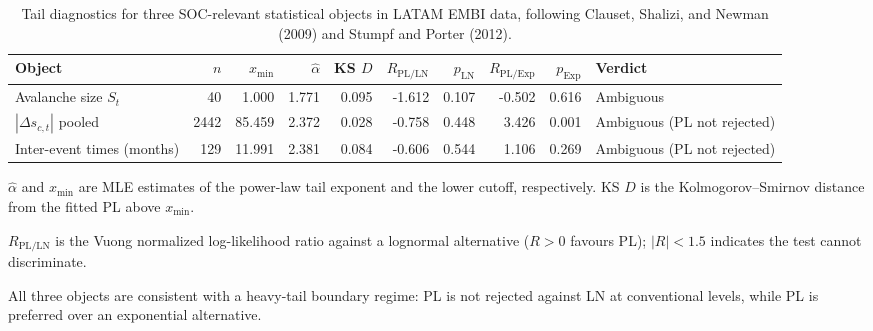 \begin{table}[!htbp]
\centering
\footnotesize
\begin{threeparttable}
\caption{Tail diagnostics for three SOC-relevant statistical objects in LATAM EMBI data, following Clauset, Shalizi, and Newman (2009) and Stumpf and Porter (2012).}
\label{tab:tail_diagnostics}
\begin{tabular}{lrrrrrrrrl}
\toprule
Object & $n$ & $x_{\min}$ & $\hat{\alpha}$ & KS $D$ & $R_{\mathrm{PL/LN}}$ & $p_{\mathrm{LN}}$ & $R_{\mathrm{PL/Exp}}$ & $p_{\mathrm{Exp}}$ & Verdict \\
\midrule
Avalanche size $S_t$ & 40 & 1.000 & 1.771 & 0.095 & -1.612 & 0.107 & -0.502 & 0.616 & Ambiguous \\
$|\Delta s_{c,t}|$ pooled & 2442 & 85.459 & 2.372 & 0.028 & -0.758 & 0.448 & 3.426 & 0.001 & Ambiguous (PL not rejected) \\
Inter-event times (months) & 129 & 11.991 & 2.381 & 0.084 & -0.606 & 0.544 & 1.106 & 0.269 & Ambiguous (PL not rejected) \\
\bottomrule
\end{tabular}
\begin{tablenotes}\footnotesize
\item $\hat{\alpha}$ and $x_{\min}$ are MLE estimates of the power-law tail exponent and the lower cutoff, respectively. KS $D$ is the Kolmogorov--Smirnov distance from the fitted PL above $x_{\min}$.
\item $R_{\mathrm{PL/LN}}$ is the Vuong normalized log-likelihood ratio against a lognormal alternative ($R>0$ favours PL); $|R|<1.5$ indicates the test cannot discriminate.
\item All three objects are consistent with a heavy-tail boundary regime: PL is not rejected against LN at conventional levels, while PL is preferred over an exponential alternative.
\end{tablenotes}
\end{threeparttable}
\end{table}
